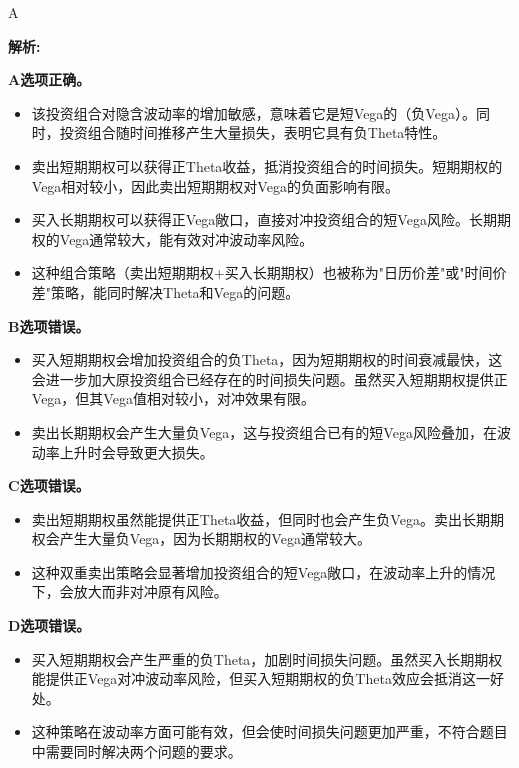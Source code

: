 \documentclass{article}
\newenvironment{explanation}
{\textbf{解析:}\par}
{\par}
\begin{document}
\begin{correctanswer}
    A
\end{correctanswer}

\begin{explanation}
    \textbf{A选项正确。}
    \begin{itemize}
        \item 该投资组合对隐含波动率的增加敏感，意味着它是短Vega的（负Vega）。同时，投资组合随时间推移产生大量损失，表明它具有负Theta特性。
        \item 卖出短期期权可以获得正Theta收益，抵消投资组合的时间损失。短期期权的Vega相对较小，因此卖出短期期权对Vega的负面影响有限。
        \item 买入长期期权可以获得正Vega敞口，直接对冲投资组合的短Vega风险。长期期权的Vega通常较大，能有效对冲波动率风险。
        \item 这种组合策略（卖出短期期权+买入长期期权）也被称为"日历价差"或"时间价差"策略，能同时解决Theta和Vega的问题。
    \end{itemize}

    \textbf{B选项错误。}
    \begin{itemize}
        \item 买入短期期权会增加投资组合的负Theta，因为短期期权的时间衰减最快，这会进一步加大原投资组合已经存在的时间损失问题。虽然买入短期期权提供正Vega，但其Vega值相对较小，对冲效果有限。
        \item 卖出长期期权会产生大量负Vega，这与投资组合已有的短Vega风险叠加，在波动率上升时会导致更大损失。
    \end{itemize}

    \textbf{C选项错误。}
    \begin{itemize}
        \item 卖出短期期权虽然能提供正Theta收益，但同时也会产生负Vega。卖出长期期权会产生大量负Vega，因为长期期权的Vega通常较大。
        \item 这种双重卖出策略会显著增加投资组合的短Vega敞口，在波动率上升的情况下，会放大而非对冲原有风险。
    \end{itemize}

    \textbf{D选项错误。}
    \begin{itemize}
        \item 买入短期期权会产生严重的负Theta，加剧时间损失问题。虽然买入长期期权能提供正Vega对冲波动率风险，但买入短期期权的负Theta效应会抵消这一好处。
        \item 这种策略在波动率方面可能有效，但会使时间损失问题更加严重，不符合题目中需要同时解决两个问题的要求。
    \end{itemize}
\end{explanation}
\end{document}
